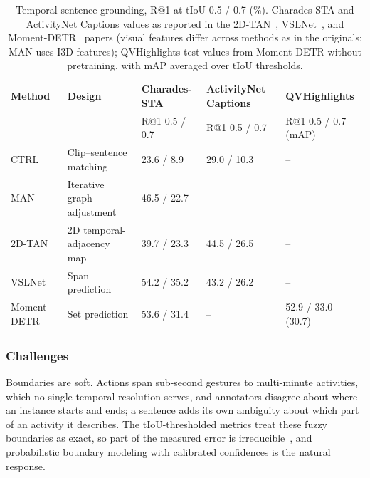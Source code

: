\begin{table}[!t]
    \centering
    \fontsize{9}{11}\selectfont
    \setlength{\tabcolsep}{1.2mm}
    \caption{Temporal sentence grounding, R@1 at tIoU 0.5 / 0.7 (\%). Charades-STA and ActivityNet Captions values as reported in the 2D-TAN~\cite{zhang2020twodtan}, VSLNet~\cite{zhang2020vslnet}, and Moment-DETR~\cite{lei2021qvhighlights} papers (visual features differ across methods as in the originals; MAN uses I3D features); QVHighlights test values from Moment-DETR without pretraining, with mAP averaged over tIoU thresholds.}
    \label{tab:temporal_localization_performance}
    \begin{tabular}{L{0.26\textwidth} L{0.26\textwidth} C{0.13\textwidth} C{0.15\textwidth} C{0.11\textwidth}}
    \toprule
    \textbf{Method} & \textbf{Design} & \textbf{Charades-STA} & \textbf{ActivityNet Captions} & \textbf{QVHighlights} \\
     & & R@1 0.5 / 0.7 & R@1 0.5 / 0.7 & R@1 0.5 / 0.7 (mAP) \\
    \midrule
    CTRL~\cite{gao2017tall}             & Clip--sentence matching      & 23.6 / 8.9  & 29.0 / 10.3 & -- \\
    MAN~\cite{zhang2019man}             & Iterative graph adjustment   & 46.5 / 22.7 & --          & -- \\
    2D-TAN~\cite{zhang2020twodtan}      & 2D temporal-adjacency map    & 39.7 / 23.3 & 44.5 / 26.5 & -- \\
    VSLNet~\cite{zhang2020vslnet}       & Span prediction              & 54.2 / 35.2 & 43.2 / 26.2 & -- \\
    Moment-DETR~\cite{lei2021qvhighlights} & Set prediction              & 53.6 / 31.4 & --          & 52.9 / 33.0 (30.7) \\
    \bottomrule
    \end{tabular}
\end{table}

\subsubsection{Challenges}

Boundaries are soft. Actions span sub-second gestures to multi-minute activities, which no single temporal resolution serves, and annotators disagree about where an instance starts and ends; a sentence adds its own ambiguity about which part of an activity it describes. The tIoU-thresholded metrics treat these fuzzy boundaries as exact, so part of the measured error is irreducible~\cite{togashi2022axiou}, and probabilistic boundary modeling with calibrated confidences is the natural response.

